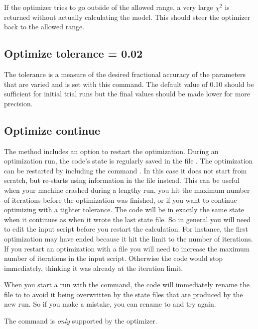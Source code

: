 If the optimizer tries to go outside of the allowed range, a very large
$\chi^2$ is returned without actually calculating the model. This should
steer the optimizer back to the allowed range.

\subsection{Optimize tolerance = 0.02}

The tolerance is a measure of the desired fractional accuracy of the
parameters that are varied and is set with this command.
The default value
of 0.10 should be sufficient for initial trial runs
but the final values
should be made lower for more precision.

\subsection{Optimize continue}

The  method includes an option to
restart the optimization. During an optimization run, the code's state is
regularly saved in the file . The optimization can be
restarted by including the command . In this case
it does not start from scratch, but re-starts using information in the file
 instead. This can be useful when your machine
crashed during a lengthy run, you hit the maximum number of iterations before
the optimization was finished, or if you want to continue optimizing with a
tighter tolerance. The code will be in exactly the same state when it
continues as when it wrote the last state file.
So in general you will need to edit the input script before you
restart the calculation.
For instance, the
first optimization may have ended because it hit the limit to the number of
iterations. If you restart an optimization with a 
file you will need to increase the maximum number of iterations in the input
script. Otherwise the code would stop immediately, thinking it was already at the
iteration limit.

When you start a run with the  command, the code
will immediately rename the file  to
 to avoid it being overwritten by the state files
that are produced by the new run. So if you make a mistake, you can rename
 to  and try again.

The  command is {\em only} supported by the 
optimizer.

